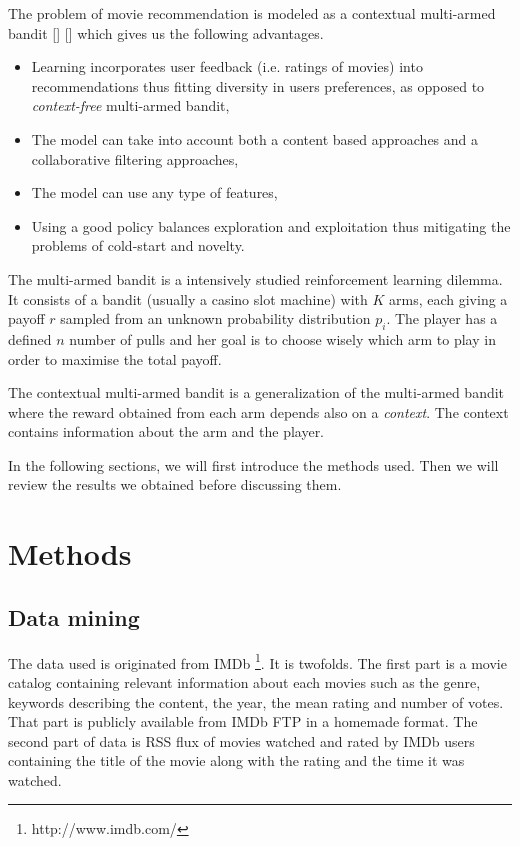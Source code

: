 \documentclass[letterpaper]{article}
\begin{document}
The problem of movie recommendation is modeled as a contextual multi-armed bandit [\cite{sutton1998reinforcement}] [\cite{lu2010contextual}] which gives us the following advantages.

\begin{itemize}
	\item Learning incorporates user feedback (i.e. ratings of movies) into recommendations thus fitting diversity in users preferences, as opposed to \textit{context-free} multi-armed bandit,
	\item The model can take into account both a content based approaches and a collaborative filtering approaches,
	\item The model can use any type of features,
	\item Using a good policy balances exploration and exploitation thus mitigating the problems of cold-start and novelty.
\end{itemize}

The multi-armed bandit is a intensively studied reinforcement learning dilemma. It consists of a bandit (usually a casino slot machine) with $K$ arms, each giving a payoff $r$ sampled from an unknown probability distribution $p_{i}$. The player has a defined $n$ number of pulls and her goal is to choose wisely which arm to play in order to maximise the total payoff.

The contextual multi-armed bandit is a generalization of the multi-armed bandit where the reward obtained from each arm depends also on a \textit{context}. The context contains information about the arm and the player.


In the following sections, we will first introduce the methods used. Then we will review the results we obtained before discussing them.

\section{Methods}

\subsection{Data mining}

The data used is originated from IMDb \footnote{http://www.imdb.com/}. It is twofolds. The first part is a movie catalog containing relevant information about each movies such as the genre, keywords describing the content, the year, the mean rating and number of votes. That part is publicly available from IMDb FTP in a homemade format. The second part of data is RSS flux of movies watched and rated by IMDb users containing the title of the movie along with the rating and the time it was watched.
\end{document}

